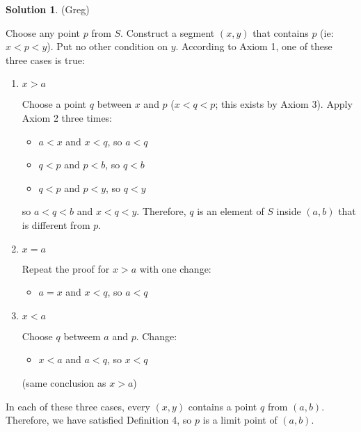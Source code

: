 \documentclass{article}
\theoremstyle{definition}
\newtheorem{solution}{Solution}
\begin{document}
\begin{solution} %
(Greg)

Choose any point $p$ from $S$.
Construct a segment $(x, y)$ that contains $p$ (ie: $x < p < y$).
Put no other condition on $y$.
According to Axiom 1, one of these three cases is true:

\begin{enumerate}
\item 
$x > a$

Choose a point $q$ between $x$ and $p$ ($x < q < p$; this exists by Axiom 3).
Apply Axiom 2 three times:
\begin{itemize}
\item $a < x$ and $x < q$, so $a < q$
\item $q < p$ and $p < b$, so $q < b$
\item $q < p$ and $p < y$, so $q < y$
\end{itemize}

so $a < q < b$ and $x < q < y$.
Therefore, $q$ is an element of $S$ inside $(a, b)$ that is different from $p$.

\item
$x = a$

Repeat the proof for $x > a$ with one change:

\begin{itemize}
\item $a = x$ and $x < q$, so $a < q$
\end{itemize}

\item
$x < a$

Choose $q$ betweem $a$ and $p$.
Change:

\begin{itemize}
\item $x < a$ and $a < q$, so $x < q$
\end{itemize}

(same conclusion as $x > a$)
\end{enumerate}

In each of these three cases, every $(x,y)$ contains a point $q$ from $(a, b)$.
Therefore, we have satisfied Definition 4, so $p$ is a limit point of $(a, b)$.

\end{solution}
\end{document}
